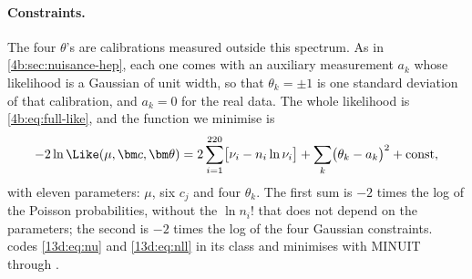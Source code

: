 \paragraph{Constraints.}
The four $\theta$'s are calibrations measured outside this spectrum. As in
\cref{4b:sec:nuisance-hep}, each one comes with an auxiliary measurement $a_k$ whose
likelihood is a Gaussian of unit width, so that $\theta_k=\pm1$ is one standard deviation
of that calibration, and $a_k=0$ for the real data. The whole likelihood is
\eqref{4b:eq:full-like}, and the function we minimise is
\begin{equation}
  -2\ln\Like(\mu,\bm c,\bm\theta)
  =2\sum_{i=1}^{220}\bigl[\nu_i-n_i\ln\nu_i\bigr]+\sum_{k}\bigl(\theta_k-a_k\bigr)^2
   +\text{const},
  \label{13d:eq:nll}
\end{equation}
with eleven parameters: $\mu$, six $c_j$ and four $\theta_k$. The first sum is $-2$ times
the log of the Poisson probabilities, without the $\ln n_i!$ that does not depend on the
parameters; the second is $-2$ times the log of the four Gaussian constraints.
 codes \eqref{13d:eq:nu} and \eqref{13d:eq:nll} in its class
 and minimises with MINUIT through .

